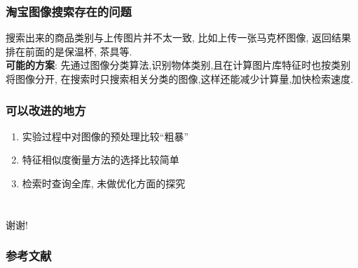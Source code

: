\documentclass[table]{beamer}
\begin{document}
\begin{frame}
	\frametitle{淘宝图像搜索存在的问题}
	搜索出来的商品类别与上传图片并不太一致, 比如上传一张马克杯图像, 返回结果排在前面的是保温杯, 茶具等.\\
	\textbf{可能的方案}: 先通过图像分类算法,识别物体类别,且在计算图片库特征时也按类别将图像分开, 在搜索时只搜索相关分类的图像,这样还能减少计算量,加快检索速度.
\end{frame}

\begin{frame}
	\frametitle{可以改进的地方}
	\begin{enumerate}
		\item 实验过程中对图像的预处理比较``粗暴''
		\item 特征相似度衡量方法的选择比较简单
		\item 检索时查询全库, 未做优化方面的探究
	\end{enumerate}
\end{frame}

\section*{}
\begin{frame}
	\begin{center}
		\vspace{0.1cm}
		\Huge{谢谢!}
	\end{center}
\end{frame}
\begin{frame}
	\frametitle{参考文献}
	\printbibliography[title={参考文献}]
\end{frame}
\end{document}
